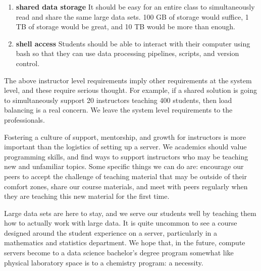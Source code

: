 \documentclass[12pt]{article}
\begin{document}
\begin{enumerate}
    An abundance of compute power is definitely not necessary if instructors follow the advice in Section~\ref{sec:data}.
\item \textbf{shared data storage} It should be easy for an entire class to simultaneously read and share the same large data sets.
    100 GB of storage would suffice, 1 TB of storage would be great, and 10 TB would be more than enough.
\item \textbf{shell access} Students should be able to interact with their computer using bash so that they can use data processing pipelines, scripts, and version control.
\end{enumerate}

The above instructor level requirements imply other requirements at the system level, and these require serious thought.
For example, if a shared solution is going to simultaneously support 20 instructors teaching 400 students, then load balancing is a real concern.
We leave the system level requirements to the professionals.

Fostering a culture of support, mentorship, and growth for instructors is more important than the logistics of setting up a server.
We academics should value programming skills, and find ways to support instructors who may be teaching new and unfamiliar topics.
Some specific things we can do are: encourage our peers to accept the challenge of teaching material that may be outside of their comfort zones, share our course materials, and meet with peers regularly when they are teaching this new material for the first time.

Large data sets are here to stay, and we serve our students well by teaching them how to actually work with large data.
It is quite uncommon to see a course designed around the student experience on a server, particularly in a mathematics and statistics department.
We hope that, in the future, compute servers become to a data science bachelor's degree program somewhat like physical laboratory space is to a chemistry program: a necessity.





\end{document}
